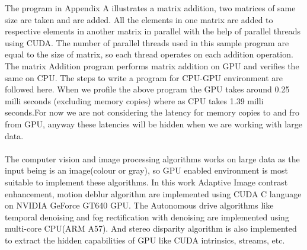 The program in Appendix A illustrates a matrix addition, two matrices of same size are taken and are added. All the elements in one matrix are added to respective elements in another matrix in parallel with the help of parallel threads using CUDA. The number of parallel threads used in this sample program are equal to the size of matrix, so each thread operates on each addition operation. The matrix Addition program performs matrix addition on GPU and verifies the same on CPU. The steps to write a program for CPU-GPU environment are followed here. When we profile the above program the GPU takes around 0.25 milli seconds (excluding memory copies) where as CPU takes 1.39 milli seconds.For now we are not considering the latency for memory copies to and fro from GPU, anyway these latencies will be hidden when we are working with large data.\paragraph*{}The computer vision and image processing algorithms works on large data as the input being is an image(colour or gray), so GPU enabled environment is most suitable to implement these algorithms. In this work Adaptive Image contrast enhancement, motion deblur algorithm are implemented using CUDA C language on NVIDIA GeForce GT640 GPU. The Autonomous drive algorithms like temporal denoising and fog rectification with denoising are implemented using multi-core CPU(ARM A57). And stereo disparity algorithm is also implemented to extract the hidden capabilities of GPU like CUDA intrinsics, streams, etc.

%